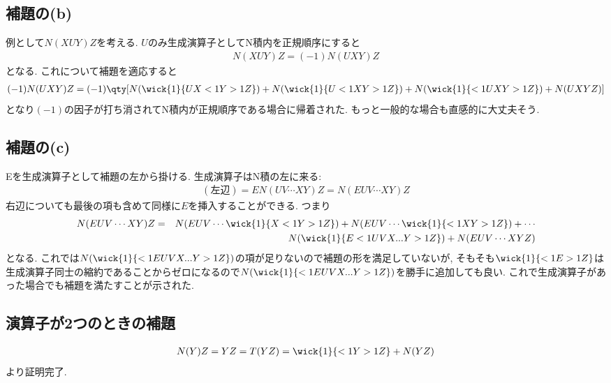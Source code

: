 \documentclass[10.5pt,a4paper]{jreport}
\begin{document}
\subsection{補題の(b)}
例として$N(XUY)Z$を考える. $U$のみ生成演算子としてN積内を正規順序にすると
\begin{eqnarray}
  N(XUY)Z = (-1)N(UXY)Z
\end{eqnarray}
となる. これについて補題を適応すると
\begin{eqnarray}
  (-1)N(UXY)Z = (-1)\qty[N(\wick{1}{UX<1Y>1Z}) + N(\wick{1}{U<1XY>1Z})+ N(\wick{1}{<1UXY>1Z})+ N(UXYZ)]
\end{eqnarray}
となり$(-1)$の因子が打ち消されてN積内が正規順序である場合に帰着された. もっと一般的な場合も直感的に大丈夫そう. 
\subsection{補題の(c)}
Eを生成演算子として補題の左から掛ける. 生成演算子はN積の左に来る:
\begin{eqnarray}
  (左辺) = EN(UV\cdots XY)Z = N(EUV\cdots XY)Z
\end{eqnarray}
右辺についても最後の項も含めて同様に$E$を挿入することができる. つまり
\begin{eqnarray}
  \nonumber  N(EUV\cdots XY)Z &=& N(EUV\cdots \wick{1}{X <1Y >1Z}) + N(EUV\cdots \wick{1}{<1X Y >1Z}) + \cdots \\
  && N(\wick{1}{E<1UVX... Y >1Z}) + N(EUV\cdots XYZ)
\end{eqnarray}
となる. これでは$N(\wick{1}{<1EUVX... Y >1Z})$の項が足りないので補題の形を満足していないが, そもそも$\wick{1}{<1E>1Z}$は生成演算子同士の縮約であることからゼロになるので$N(\wick{1}{<1EUVX... Y >1Z})$を勝手に追加しても良い. これで生成演算子があった場合でも補題を満たすことが示された. 
\subsection{演算子が2つのときの補題}
\begin{eqnarray}
  N(Y)Z = YZ = T(YZ) = \wick{1}{<1Y >1Z} + N(YZ)
\end{eqnarray}
より証明完了.
\end{document}
